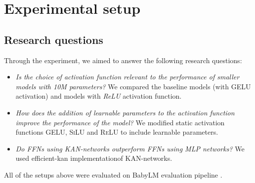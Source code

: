 
\section{Experimental setup} %
\label{sec:experimental_setup}

\subsection{Research questions}
Through the experiment, we aimed to answer the following research questions:
\begin{itemize}
    \item \textit{Is the choice of activation function relevant to the performance of smaller models with 10M parameters?}  We compared the baseline models (with \textsc{GELU} activation) and models with \textit{ReLU} activation function.
    \item \textit{How does the addition of learnable parameters to the activation function improve the performance of the model?} We modified static activation functions \textsc{GELU}, \textsc{SiLU} and \textsc{ReLU} to include learnable parameters.
    \item \textit{Do FFNs using KAN-networks outperform FFNs using MLP networks?} We used efficient-kan implementation\footnotemark[3] of KAN-networks.
\end{itemize}
All of the setups above were evaluated on BabyLM evaluation pipeline \cite{Warstadt2023}.

